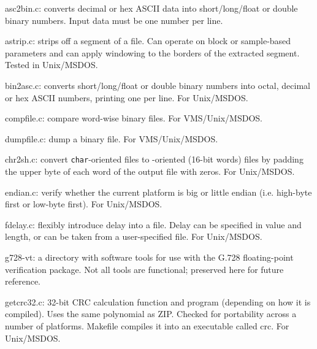 \begin{Descr}{40mm}
\item[asc2bin.c:]
        converts decimal or hex ASCII data into short/long/float
                or double binary numbers. Input data must be one
                number per line.

\item[astrip.c:]
        strips off a segment of a file. Can operate on block or
                sample-based parameters and can apply windowing to the
                borders of the extracted segment. Tested in Unix/MSDOS.

\item[bin2asc.c:]
        converts short/long/float or double binary numbers into
                octal, decimal or hex ASCII numbers, printing one per
                line. For Unix/MSDOS.

\item[compfile.c:]
        compare word-wise binary files. For VMS/Unix/MSDOS.

\item[dumpfile.c:]
        dump a binary file. For VMS/Unix/MSDOS.

\item[chr2sh.c:]
           convert {\tt char}-oriented files to \short-oriented (16-bit
           words) files by padding the upper byte of each word of
           the output file with zeros. For Unix/MSDOS.

\item[endian.c:]
  verify whether the current platform is big or little endian
  (i.e. high-byte first or low-byte first). For Unix/MSDOS.

\item[fdelay.c:]
        flexibly introduce delay into a file. Delay
        can be specified in value and length, or can be taken
        from a user-specified file. For Unix/MSDOS.

\item[g728-vt:]
            a directory with software tools for use with the G.728
            floating-point verification package. Not all tools are
            functional; preserved here for future reference.

\item[getcrc32.c:]
         32-bit CRC calculation function and program (depending on
         how it is compiled). Uses the same polynomial as
         ZIP. Checked for portability across a number of
         platforms. Makefile compiles it into an executable called
         crc. For Unix/MSDOS.


\end{Descr}
